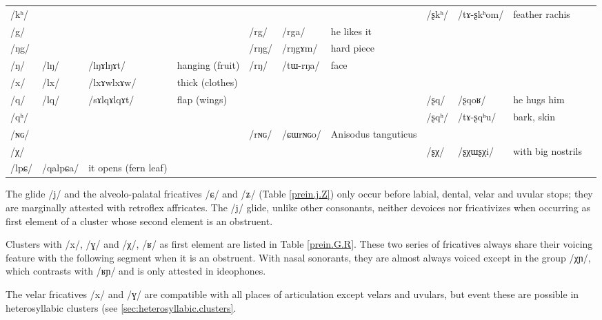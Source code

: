 \documentclass[oldfontcommands,oneside,a4paper,11pt]{article}
\newcommand{\ipa}[1]{/#1/} %
\newcommand{\deux}[1]{/#1/}
\newcommand{\trois}[1]{/#1/}
\newcommand{\idph}[1]{\cellcolor{gray}\textbf{#1}}
\begin{document}
\begin{table}
{\begin{tabular}{l|lll|lll|lll|l}
\ipa{kʰ}  & 	  & 	  & 	  & 	 & 	 & 	 & 	 \deux{ʂkʰ}  & 	 \ipa{tɤ-ʂkʰom}  & 	 feather rachis & 	\\	
\ipa{g}  & 	  & 	  & 	  & 	 \deux{rg}  & 	 \ipa{rga}  & 	 he likes it & 	 & 	 & 	 & 	\\	
\ipa{ŋg}  & 	  & 	  & 	  & 	 \deux{rŋg}  & 	 \ipa{rŋgɤm}  & 	hard piece  & 	 & 	 & 	 & 	\\	
\ipa{ŋ}  & 	 \deux{lŋ} \idph{}  & 	 \ipa{lŋɤlŋɤt}  & 	hanging (fruit)  & 	 \deux{rŋ}  & 	 \ipa{tɯ-rŋa}  & 	 face & 	 & 	 & 	 & 	\\	
\ipa{x}  & 	 \deux{lx} \idph{}  & 	 \ipa{lxɤwlxɤw}  & 	thick (clothes)  & 	  & 	  & 	  & 	 & 	 & 	 & 	\\	
\ipa{q}  & 	\deux{lq}  & \ipa{sɤlqɤlqɤt}	  &flap (wings) 	  & 	 & 	 & 	 & 	 \deux{ʂq}  & 	 \ipa{ʂqoʁ}  & 	he hugs him  & 	\\	
\ipa{qʰ}  & 	  & 	  & 	  & 	 & 	 & 	 & 	 \deux{ʂqʰ}  & 	 \ipa{tɤ-ʂqʰu}  & 	bark, skin & 	\\	
\ipa{ɴɢ}  & 	  & 	  & 	  & 	 \deux{rɴɢ}  & 	 \ipa{ɕɯrɴɢo}  & 	Anisodus tanguticus  & 	 & 	 & 	 & 	\\	
\ipa{χ}  & 	  & 	  & 	  & 	 & 	 & 	 & 	 \deux{ʂχ}  & 	 \ipa{ʂχɯʂχi}  & 	with big nostrils  & 	\\	
\midrule
\trois{lpɕ}	&\ipa{qalpɕa} & it opens (fern leaf) \\
\bottomrule
\end{tabular}}
\end{table}
 
  The glide /j/  and the alveolo-palatal fricatives /ɕ/ and /ʑ/ (Table \ref{prein.j.Z}) only occur before labial, dental, velar and uvular stops; they are marginally attested with retroflex affricates. The \ipa{j} glide, unlike other consonants, neither devoices nor fricativizes when occurring as first element of a cluster whose second element is an obstruent.


  Clusters with   /x/, /ɣ/ and /χ/, /ʁ/ as first element are listed in Table \ref{prein.G.R}. These two series of fricatives  always share their voicing feature with the following segment when it is an obstruent. With nasal sonorants, they are  almost always voiced except in the group \ipa{χɲ}, which contrasts with \ipa{ʁɲ} and is only attested in ideophones.
  
 
  The velar fricatives /x/ and /ɣ/ are compatible with all places of articulation except velars and uvulars, but event these are possible in heterosyllabic clusters (see \ref{sec:heterosyllabic.clusters}.
  
\end{document}
